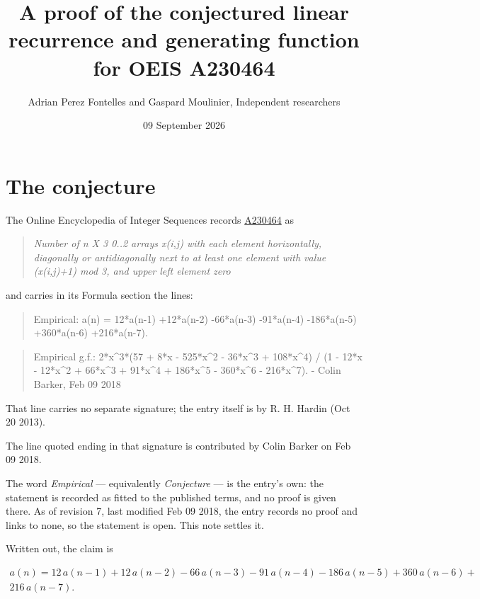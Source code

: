 \documentclass[11pt]{article}
\title{A proof of the conjectured linear recurrence and generating function for OEIS A230464}
\author{Adrian Perez Fontelles and Gaspard Moulinier, Independent researchers}
\date{09 September 2026}
\theoremstyle{definition}
\begin{document}
\maketitle
\section{The conjecture}

The Online Encyclopedia of Integer Sequences records \href{https://oeis.org/A230464}{A230464} as

\begin{quote}\itshape Number of n X 3 0..2 arrays x(i,j) with each element horizontally, diagonally or antidiagonally next to at least one element with value (x(i,j)+1) mod 3, and upper left element zero\end{quote}

and carries in its Formula section the lines:

\begin{quote}\ttfamily Empirical: a(n) = 12*a(n-1) +12*a(n-2) -66*a(n-3) -91*a(n-4) -186*a(n-5) +360*a(n-6) +216*a(n-7).\end{quote}

\begin{quote}\ttfamily Empirical g.f.: 2*x\textasciicircum{}3*(57 + 8*x - 525*x\textasciicircum{}2 - 36*x\textasciicircum{}3 + 108*x\textasciicircum{}4) / (1 - 12*x - 12*x\textasciicircum{}2 + 66*x\textasciicircum{}3 + 91*x\textasciicircum{}4 + 186*x\textasciicircum{}5 - 360*x\textasciicircum{}6 - 216*x\textasciicircum{}7). - Colin Barker, Feb 09 2018\end{quote}

That line carries no separate signature; the entry itself is by R. H. Hardin (Oct 20 2013).

The line quoted ending in that signature is contributed by Colin Barker on Feb 09 2018.

The word {\itshape Empirical} --- equivalently {\itshape Conjecture} --- is the entry's own: the statement is recorded as fitted to the published terms, and no proof is given there. As of revision 7, last modified Feb 09 2018, the entry records no proof and links to none, so the statement is open. This note settles it.

Written out, the claim is

\begin{multline*} a(n) = 12\,a(n-1) + 12\,a(n-2) - 66\,a(n-3) - 91\,a(n-4) - 186\,a(n-5) + 360\,a(n-6) + \\ 216\,a(n-7). \end{multline*}
\end{document}
